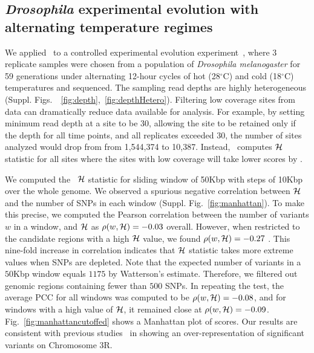 \documentclass[11pt]{article}
\def\comale{\text{{\sc Comale}}}
\begin{document}
\subsection{\emph{Drosophila} experimental evolution with alternating temperature regimes}
We applied \comale\ to a controlled experimental evolution
experiment~\cite{orozco2012adaptation}, where $3$ replicate samples
were chosen from a population of \emph{Drosophila melanogaster} for 59
generations under alternating 12-hour cycles of hot (28$^{\circ}$C)
and cold (18$^{\circ}$C) temperatures and sequenced. The sampling read
depths are highly heterogeneous
(Suppl. Figs.~~\ref{fig:depth},~\ref{fig:depthHetero}). Filtering low
coverage sites from data can dramatically reduce data available for
analysis. For example, by setting minimum read depth at a site to be
$30$, allowing the site to be retained only if the depth for all time
points, and all replicates exceeded $30$, the number of sites analyzed
would drop from from 1,544,374 to 10,387. Instead, \comale\ computes
${\cal H}$ statistic for all sites where the sites with low coverage will
take lower scores by \comale.

We computed the \comale\ ${\cal H}$ statistic for sliding
window of 50Kbp with steps of 10Kbp over the whole genome. We observed
a spurious negative correlation between ${\cal H}$ and the number of SNPs
in each window (Suppl. Fig.~\ref{fig:manhattan}). To make this
precise, we computed the Pearson correlation between the number of
variants $w$ in a window, and ${\cal H}$ as $\rho(w,{\cal H})=-0.03$
overall. However, when restricted to the candidate regions with a high
${\cal H}$ value, we found $\rho(w,{\cal H})=-0.27$ . This nine-fold increase in
correlation indicates that ${\cal H}$ statistic takes more extreme values
when SNPs are depleted. Note that the expected number of variants in a
$50$Kbp window equals $1175$ by Watterson's estimate. Therefore, we
filtered out genomic regions containing fewer than $500$ SNPs. In
repeating the test, the average PCC for all windows was computed to be
$\rho(w,{\cal H})=-0.08$, and for windows with a high value of ${\cal H}$, it
remained close at
$\rho(w,{\cal H})=-0.09$. Fig.~\ref{fig:manhattancutoffed} shows a
Manhattan plot of scores. Our results are consistent with previous
studies~\cite{orozco2012adaptation} in showing an over-representation
of significant variants on Chromosome 3R.
\end{document}
